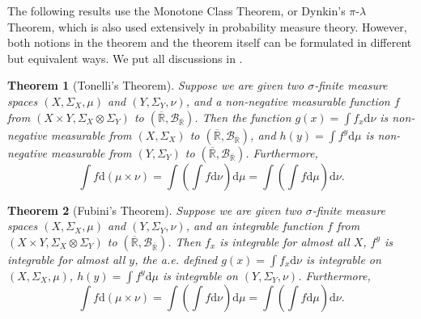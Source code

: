 \documentclass[openany]{book}
\newtheorem{theorem}{Theorem}[chapter]
\theoremstyle{definition}
\theoremstyle{remark}
\begin{document}
The following results use the Monotone Class Theorem, or Dynkin's $\pi$-$\lambda$ Theorem, which is also used extensively in probability measure theory. However, both notions in the theorem and the theorem itself can be formulated in different but equivalent ways. We put all discussions in .

\begin{theorem}[Tonelli's Theorem]
    Suppose we are given two $\sigma$-finite measure spaces $(X,\Sigma_X,\mu)$ and $(Y,\Sigma_Y,\nu)$, and a non-negative measurable function $f$ from $(X\times Y,\Sigma_X\otimes\Sigma_Y)$ to $(\overline{\mathbb{R}},\mathcal{B}_{\overline{\mathbb{R}}})$. Then the function $g(x)=\int f_x \mathrm{d}\nu$ is non-negative measurable from $(X,\Sigma_X)$ to $(\overline{\mathbb{R}},\mathcal{B}_{\overline{\mathbb{R}}})$, and $h(y)=\int f^y \mathrm{d}\mu$ is non-negative measurable from $(Y,\Sigma_Y)$ to $(\overline{\mathbb{R}},\mathcal{B}_{\overline{\mathbb{R}}})$. Furthermore,
    \begin{equation*}
        \int f \mathrm{d}(\mu\times\nu)=\int\left(\int f \mathrm{d}\nu\right)\mathrm{d}\mu=\int\left(\int f \mathrm{d}\mu\right)\mathrm{d}\nu.
    \end{equation*}
\end{theorem}
\begin{theorem}[Fubini's Theorem]
    Suppose we are given two $\sigma$-finite measure spaces $(X,\Sigma_X,\mu)$ and $(Y,\Sigma_Y,\nu)$, and an integrable function $f$ from $(X\times Y,\Sigma_X\otimes\Sigma_Y)$ to $(\overline{\mathbb{R}},\mathcal{B}_{\overline{\mathbb{R}}})$. Then $f_x$ is integrable for almost all $X$, $f^y$ is integrable for almost all $y$, the a.e. defined $g(x)=\int f_x \mathrm{d}\nu$ is integrable on $(X,\Sigma_X,\mu)$, $h(y)=\int f^y \mathrm{d}\mu$ is integrable on $(Y,\Sigma_Y,\nu)$. Furthermore,
    \begin{equation*}
        \int f \mathrm{d}(\mu\times\nu)=\int\left(\int f \mathrm{d}\nu\right)\mathrm{d}\mu=\int\left(\int f \mathrm{d}\mu\right)\mathrm{d}\nu.
    \end{equation*}
\end{theorem}
\end{document}
